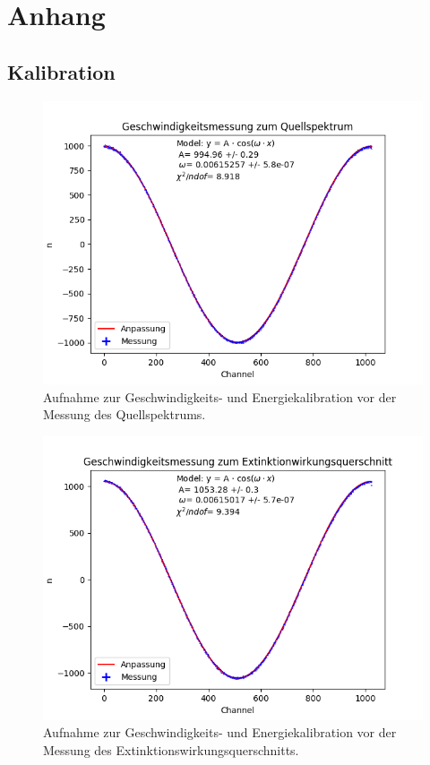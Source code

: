 \documentclass[12pt,a4paper]{article}
\begin{document}
\newpage
\section{Anhang}
\subsection{Kalibration}
\begin{figure} [H]
\centering
\includegraphics[scale=0.8]{Bilder/Kalibration/Quellspektrum.png}
\caption{Aufnahme zur Geschwindigkeits- und Energiekalibration vor der Messung des Quellspektrums.}
\end{figure}

\begin{figure} [H]
\centering
\includegraphics[scale=0.8]{Bilder/Kalibration/Extinktion.png}
\caption{Aufnahme zur Geschwindigkeits- und Energiekalibration vor der Messung des Extinktionswirkungsquerschnitts.}
\end{figure}
\end{document}
